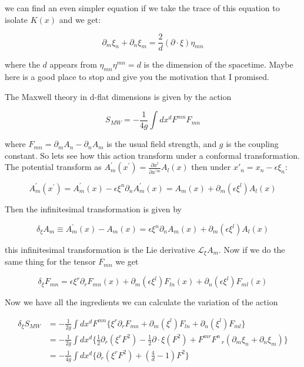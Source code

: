 we can find an even simpler equation if we take the trace of this equation to isolate $K(x)$ and we get: 

\begin{equation}
\partial_{m}\xi_{n} + \partial_{n}\xi_{m} = \frac{2}{d}(\partial \cdot \xi)\eta_{mn}
\label{eq3.1}
\end{equation}

where the $d$ appears from $\eta_{mn}\eta^{mn} = d$ is the dimension of the spacetime. Maybe here is a good place to stop and give you the motivation that I promised.

The Maxwell theory in d-flat dimensions is given by the action

\begin{equation}
S_{MW} = -\frac{1}{4g} \int dx^{d} F^{mn}F_{mn}
\end{equation}

where $F_{mn} = \partial_{m}A_{n} - \partial_{n}A_{m}$  is the usual field strength, and $g$ is the coupling constant. So lets see how this action transform under a conformal transformation. The potential transform as  $A_{m}^{'}(x^{'}) = \frac{\partial x^{l}}{\partial x^{'m}} A_{l}(x) $ then under $x'_{n} = x_{n} - \epsilon\xi_{n} $:

\begin{equation*}
A_{m}^{'}(x^{'}) = A_{m}^{'}(x) -  \epsilon\xi^{n}\partial_{n} A_{m}^{'}(x) = A_{m}(x) +  \partial_{m}(\epsilon\xi^{l})A_{l}(x)
\end{equation*}

Then the infinitesimal transformation is given by 

\begin{equation}
\delta_{\xi}A_{m} \equiv A_{m}^{'}(x) - A_{m}(x)  =  \epsilon\xi^{n}\partial_{n} A_{m}(x) +  \partial_{m}(\epsilon\xi^{l})A_{l}(x)
\end{equation}

this infinitesimal transformation is the Lie derivative $\mathcal L_{\xi} A_{m}$. Now if we do the same thing for the tensor $F_{mn}$ we get 

\begin{equation}
\delta_{\xi}F_{mn}   =  \epsilon\xi^{r}\partial_{r} F_{mn}(x) +  \partial_{m}(\epsilon\xi^{l})F_{ln}(x) + \partial_{n}(\epsilon\xi^{l})F_{ml}(x)
\end{equation}

Now we have all the ingredients we can calculate the variation of the action 

\begin{align}
 \delta_{\xi}S_{MW} &= -\frac{1}{2g} \int dx^{d} F^{mn}\{ \xi^{r}\partial_{r} F_{mn} +  \partial_{m}(\xi^{l})F_{ln} + \partial_{n}(\xi^{l})F_{ml}\}	\\
 &=  -\frac{1}{2g}\int dx^{d}\{\frac{1}{2} \partial_{r}(\xi^{r}F^{2}) -\frac{1}{2}\partial \cdot \xi (F^{2}) + F^{mr}F^{n}_{\;\;\;r}(\partial_{m}\xi_{n} +\partial_{n}\xi_{m} )			\}\\
 &= -\frac{1}{4g} \int dx^{d} \{ \partial_{r}(\xi^{r}F^{2}) + (\frac{4}{d} - 1)F^{2} \}
\end{align}

